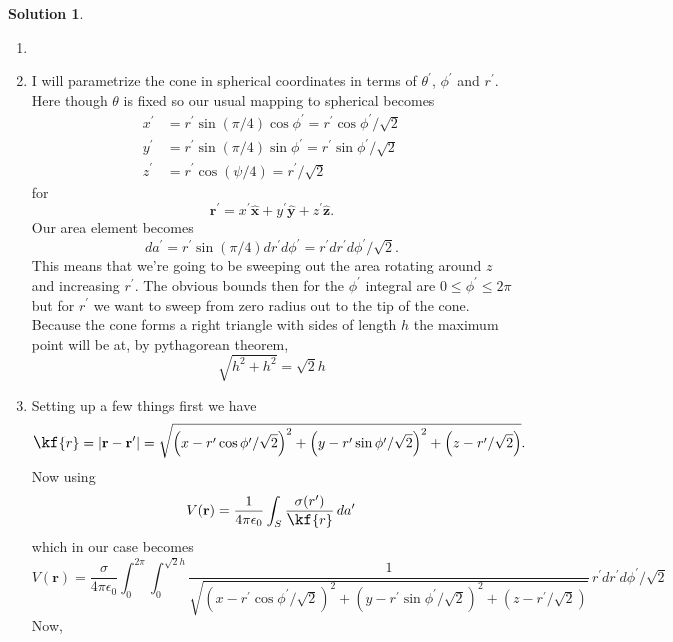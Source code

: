 \documentclass[10pt]{article}
\theoremstyle{definition}
\newtheorem{soln}{Solution}
\newcommand{\ux}{\hat{\mathbf{x}}}
\newcommand{\uy}{\hat{\mathbf{y}}}
\newcommand{\uz}{\hat{\mathbf{z}}}
\newcommand{\primed}[1]{{#1^\prime}}
\newcommand{\scriptr}{\fontsize{12pt}{12pt}\kf{r}}
\newcommand{\bv}[1]{\mathbf{#1}}
\begin{document}
\begin{soln}~
  \begin{enumerate}[label=(\alph*)]
    \item \newpage
    \item I will parametrize the cone in spherical coordinates in terms of $\primed{\theta}$, $\primed{\phi}$ and $\primed{r}$.
          Here though $\theta$ is fixed so our usual mapping to spherical becomes
          \begin{align*}
            \primed{x} & =\primed{r} \sin \left(\pi/4\right)\cos\primed{\phi}=\primed{r}\cos\primed{\phi}/\sqrt{2} \\
            \primed{y} & =\primed{r} \sin \left(\pi/4\right)\sin\primed{\phi}=\primed{r}\sin\primed{\phi}/\sqrt{2} \\
            \primed{z} & =\primed{r} \cos \left(\psi/4\right)=\primed{r}/\sqrt{2}
          \end{align*}
          for
          $$\primed{\bv{r}}=\primed{x}\ux+\primed{y}\uy+\primed{z}\uz.$$
          Our area element becomes
          $$d\primed{a}=\primed{r}\sin\left(\pi/4\right)d\primed{r}d\primed{\phi}=\primed{r}d\primed{r}d\primed{\phi}/\sqrt{2}.$$
          This means that we're going to be sweeping out the area rotating around $z$ and increasing $\primed{r}$. The obvious bounds
          then for the $\primed{\phi}$ integral are $0\leq \primed{\phi}\leq 2\pi$ but for
          $\primed{r}$ we want to sweep from zero radius out to the tip of the cone. Because the cone forms a right triangle
          with sides of length $h$ the maximum point will be at, by pythagorean theorem,
          $$\sqrt{h^2+h^2}=\sqrt{2}h$$
    \item Setting up a few things first we have
          $$\scriptr=\abs{\bv{r}-\primed{\bv{r}}}
            =\sqrt{\left(x-\primed{r}\cos\primed{\phi}/\sqrt{2}\right)^2
              +\left(y-\primed{r}\sin\primed{\phi}/\sqrt{2}\right)^2
              +\left(z-\primed{r}/\sqrt{2}\right)
            }.
          $$
          Now using
          $$V(\bv{r})=\frac{1}{4\pi\epsilon_0}\int_{S}\frac{\sigma(\primed{r})}{\scriptr}\,d\primed{a}$$
          which in our case becomes
          $$V(\bv{r})=\frac{\sigma}{4\pi\epsilon_0}
            \int_{0}^{2\pi}\int_{0}^{\sqrt{2}h}
            \frac{1}{\sqrt{\left(x-\primed{r}\cos\primed{\phi}/\sqrt{2}\right)^2
                +\left(y-\primed{r}\sin\primed{\phi}/\sqrt{2}\right)^2
                +\left(z-\primed{r}/\sqrt{2}\right)
              }}
            \,\primed{r}d\primed{r}d\primed{\phi}/\sqrt{2}$$
          Now,

\end{enumerate}
\end{soln}
\end{document}
